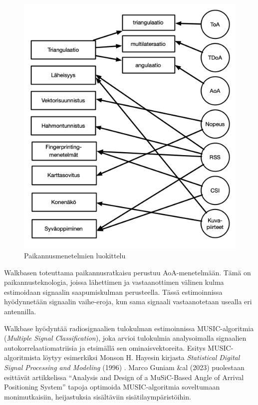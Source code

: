 \documentclass[
  12pt,
  a4paper, twoside]{book}
\begin{document}
\begin{figure}[H]
\centering
\includegraphics[width=12.5cm]{paikannusmenetelmat}
\caption{Paikannusmenetelmien luokittelu}
\label{fig:paikannusmenetelmat}
\end{figure}

Walkbasen toteuttama paikannusratkaisu perustuu AoA-menetelmään. Tämä on paikannusteknologia, joissa lähettimen ja vastaanottimen välinen kulma estimoidaan signaalin saapumiskulman perusteella. Tässä estimoinnissa hyödynnetään signaalin vaihe-eroja, kun sama signaali vastaanotetaan usealla eri antennilla.

Walkbase hyödyntää radiosignaalien tulokulman estimoinnissa MUSIC-algoritmia (\emph{Multiple Signal Classification}), joka arvioi tulokulmia analysoimalla signaalien autokorrelaatiomatriisia ja etsimällä sen ominaisvektoreita. Esitys MUSIC-algoritmista löytyy esimerkiksi Monson H. Hayesin kirjasta \emph{Statistical Digital Signal Processing and Modeling} (1996) \citep{Hayes-1996}. Marco Guniam \&al (2023) \citep{Gunia-2023} puolestaan esittävät artikkelissa ``Analysis and Design of a MuSiC-Based Angle of Arrival Positioning System'' tapoja optimoida MUSIC-algoritmia soveltumaan monimutkaisiin, heijastuksia sisältäviin sisätilaympäristöihin.
\end{document}
